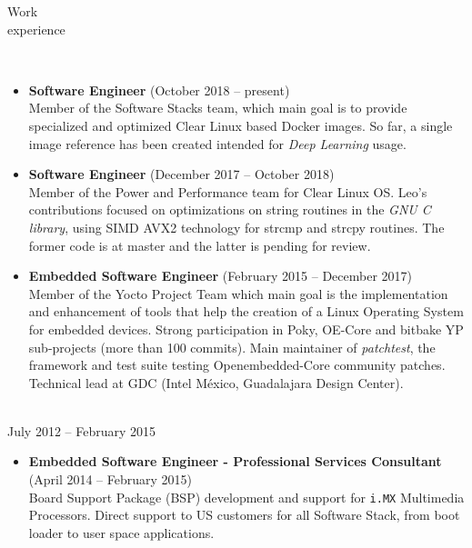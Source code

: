 \documentclass{resume}
\begin{document}
\begin{category}{Work \\experience}

\\

\begin{itemize}
\item \textbf{Software Engineer} (October 2018 -- present)\\
  Member of the Software Stacks team, which main goal is to provide
  specialized and optimized Clear Linux based Docker images. So far, a single
  image reference has been created intended for \textit{Deep Learning} usage. 
\end{itemize}


\begin{itemize}
\item \textbf{Software Engineer} (December 2017 -- October 2018)\\
  Member of the Power and Performance team for Clear Linux OS. Leo's
  contributions focused on optimizations on string routines in the \textit{GNU
    C library}, using SIMD AVX2 technology for strcmp and strcpy routines. The
  former code is at master and the latter is pending for review.
\end{itemize}

\begin{itemize}
\item \textbf{Embedded Software Engineer} (February 2015 -- December 2017)\\
  Member of the Yocto Project Team which main goal is the implementation and
  enhancement of tools that help the creation of a Linux Operating System
  for embedded devices. Strong participation in Poky, OE-Core and bitbake
  YP sub-projects (more than 100 commits). Main maintainer of
  \textit{patchtest}, the framework and test suite testing Openembedded-Core
  community patches. Technical lead at GDC (Intel M\'exico, Guadalajara Design Center).
\end{itemize}

\\
July 2012 -- February 2015
\begin{itemize}
\item \textbf{Embedded Software Engineer - Professional Services Consultant} (April 2014 -- February 2015)\\
  Board Support Package (BSP) development and support for \texttt{i.MX}
  Multimedia Processors. Direct support to US customers for all Software
  Stack, from boot loader to user space applications.
\end{itemize}


\end{category}
\end{document}
